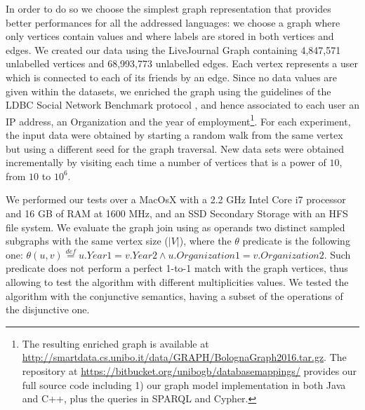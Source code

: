 \label{sec:data} In order to do so we choose the simplest graph representation that
provides better performances for all the addressed languages: we choose a graph where
only vertices contain values and where labels are stored in both vertices and edges.
We created our data using the LiveJournal Graph \cite{dataSIOC} containing 4,847,571
unlabelled vertices and 68,993,773 unlabelled edges. Each vertex represents a user
which is connected to each of its friends by an edge. Since no data values are given
within the datasets, we enriched the graph using the guidelines of the
LDBC Social Network Benchmark protocol \cite{Erling}, and hence associated to each user
an IP address, an Organization and the year of employment\footnote{The resulting enriched
	graph is available at \url{http://smartdata.cs.unibo.it/data/GRAPH/BolognaGraph2016.tar.gz}. The repository at \url{https://bitbucket.org/unibogb/databasemappings/} provides
	our full source code including 1) our graph model implementation in both Java and C++,
	plus the queries in SPARQL and Cypher.}.
For each experiment, the input data were obtained by starting a random walk from the same vertex
but using a different seed for the graph traversal. New data sets were obtained incrementally
by visiting each time a number of vertices that is a power of $10$, from $10$ to $10^6$.

We performed our tests over a MacOsX with
a 2.2 GHz Intel Core i7 processor and 16 GB of RAM at 1600 MHz, and an SSD Secondary Storage with an HFS file system.
We evaluate the graph join using as operands two distinct sampled subgraphs with the same vertex size ($|V|$), where the
$\theta$ predicate is the following one: $\theta(u,v)\overset{def}{=}u.Year1 = v.Year2\wedge u.Organization1 = v.Organization2$. Such predicate does not perform a perfect 1-to-1 match with the graph vertices, thus
allowing to test the algorithm with different multiplicities values.
We tested the algorithm with the conjunctive semantics, having
a subset of the operations of the disjunctive one.

